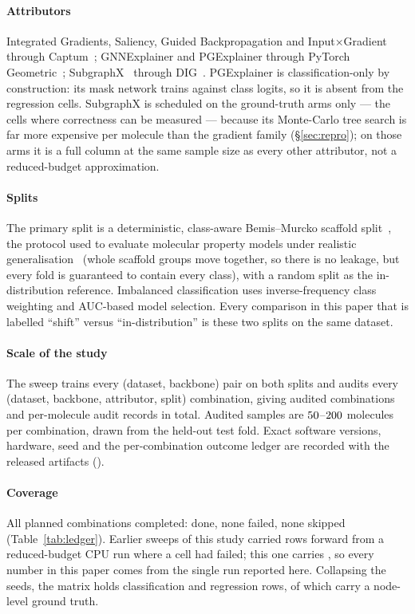 \paragraph{Attributors} Integrated Gradients, Saliency, Guided Backpropagation
and Input×Gradient through Captum~\cite{captum}; GNNExplainer and PGExplainer
through PyTorch Geometric~\cite{pyg}; SubgraphX~\cite{subgraphx} through
DIG~\cite{dig}. PGExplainer is classification-only by construction: its mask
network trains against class logits, so it is absent from the regression
cells. SubgraphX is scheduled on the ground-truth arms only --- the cells where
correctness can be measured --- because its Monte-Carlo tree search is far more
expensive per molecule than the gradient family (\S\ref{sec:repro}); on those
arms it is a full column at the same sample size as every other attributor,
not a reduced-budget approximation.

\paragraph{Splits} The primary split is a deterministic, class-aware
Bemis--Murcko scaffold split~\cite{murcko}, the protocol used to evaluate
molecular property models under realistic generalisation~\cite{mjepa} (whole scaffold groups move together,
so there is no leakage, but every fold is guaranteed to contain every class),
with a random split as the in-distribution reference. Imbalanced classification
uses inverse-frequency class weighting and AUC-based model selection. Every
comparison in this paper that is labelled ``shift'' versus ``in-distribution''
is these two splits on the same dataset.

\paragraph{Scale of the study} The sweep trains every (dataset, backbone)
pair on both splits and audits every (dataset, backbone, attributor, split)
combination, giving \nDone{} audited combinations and \nRecords{} per-molecule
audit records in total. Audited samples are $50{}$--$200{}$ molecules per combination,
drawn from the held-out test fold. Exact software versions, hardware, seed and
the per-combination outcome ledger are recorded with the released artifacts
().



\paragraph{Coverage} All \nAttempted{} planned combinations completed:
\nDone{} done, none failed, none skipped (Table~\ref{tab:ledger}). Earlier
sweeps of this study carried rows forward from a reduced-budget CPU run where a
cell had failed; this one carries \nCarried{}, so every number in this paper
comes from the single run reported here. Collapsing the \nPooledSeeds{} seeds,
the matrix holds \nClsRows{} classification and \nRegRows{} regression rows, of
which \nGtCells{} carry a node-level ground truth.


